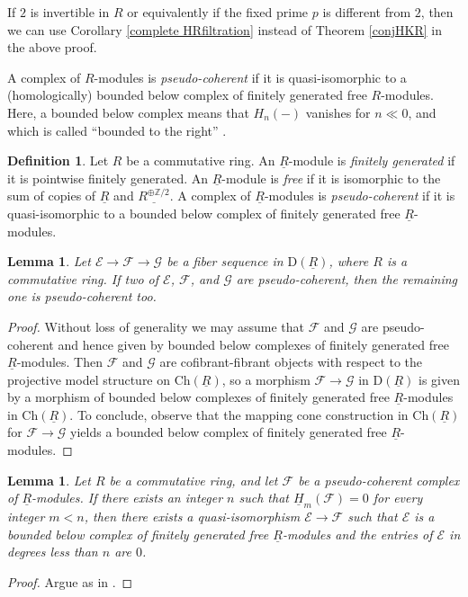\documentclass[10pt]{amsart}
\newtheorem{lem}[thm]{Lemma}
\theoremstyle{definition}
\newtheorem{df}[thm]{Definition}
\numberwithin{equation}{section}
\newcommand{\Z}{\mathbb{Z}}
\newcommand{\cE}{\mathcal{E}}
\newcommand{\cF}{\mathcal{F}}
\newcommand{\cG}{\mathcal{G}}
\newcommand{\rD}{\mathrm{D}}
\newcommand{\ul}{\underline}
\newcommand{\Ch}{\mathrm{Ch}}
\begin{document}
If $2$ is invertible in $R$ or equivalently if the fixed prime $p$ is different from $2$,
then we can use Corollary \ref{complete HRfiltration} instead of Theorem \ref{conjHKR} in the above proof.


A complex of $R$-modules is \emph{pseudo-coherent} if it is quasi-isomorphic to a (homologically) bounded below complex of finitely generated free $R$-modules.
Here, a bounded below complex means that $H_n(-)$ vanishes for $n\ll 0$, and which is called ``bounded to the right'' \cite[p.\ 243]{BMS19}.


\begin{df}
\label{pseudo coherent}
Let $R$ be a commutative ring.
An $\ul{R}$-module is \emph{finitely generated} if it is pointwise finitely generated.
An $\ul{R}$-module is \emph{free} 
if it is isomorphic to the sum of copies of $\ul{R}$ and $\ul{R^{\oplus \Z/2}}$. 
A complex of $\ul{R}$-modules is \emph{pseudo-coherent} if it is
quasi-isomorphic
to a bounded below complex of finitely generated free
$\ul{R}$-modules.
\end{df}

\begin{lem}
\label{lem:pseudo-coherence and exact sequence}
Let $\cE\to \cF\to \cG$ be a fiber sequence
in $\rD(\ul{R})$,
where $R$ is a commutative ring.
If two of $\cE$, $\cF$, and $\cG$ are pseudo-coherent,
then the remaining one is pseudo-coherent too.
\end{lem}
\begin{proof}
Without loss of generality
we may assume that $\cF$ and $\cG$ are pseudo-coherent and hence given by bounded below complexes of finitely generated free $\ul{R}$-modules.
Then $\cF$ and $\cG$ are cofibrant-fibrant objects with respect to the projective model structure on $\Ch(\ul{R})$,
so a morphism $\cF\to \cG$ in $\rD(\ul{R})$ is given by a morphism of bounded below complexes of finitely generated free $\ul{R}$-modules in $\Ch(\ul{R})$.
To conclude, observe that the mapping cone construction in $\Ch(\ul{R})$ for $\cF\to \cG$ yields a bounded below complex of finitely generated free $\ul{R}$-modules.
\end{proof}






\begin{lem}
\label{bounded pseudo-coherent}
Let $R$ be a commutative ring,
and let $\cF$ be a pseudo-coherent complex of $\ul{R}$-modules.
If there exists an integer $n$ such that $\ul{H}_m(\cF)=0$ for every integer $m<n$,
then there exists a quasi-isomorphism $\cE\to \cF$ such that $\cE$ is a bounded below complex of finitely generated free $\ul{R}$-modules and the entries of $\cE$ in degrees less than $n$ are $0$.
\end{lem}
\begin{proof}
Argue as in \cite[\href{https://stacks.math.columbia.edu/tag/064U}{Tag 064U}]{stacks}.
\end{proof}
\end{document}
